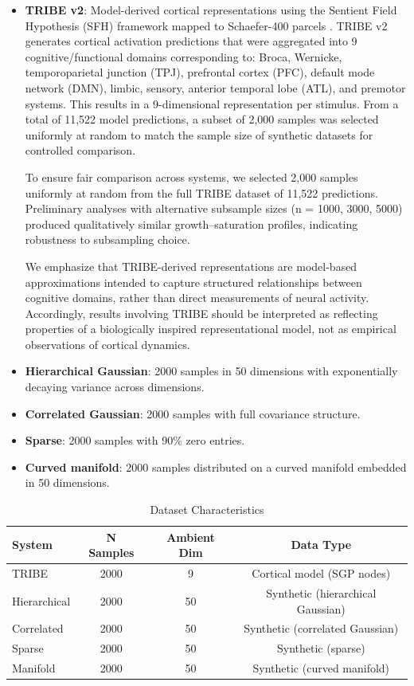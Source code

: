 \begin{itemize}
	\item \textbf{TRIBE v2}: Model-derived cortical representations using the Sentient Field Hypothesis (SFH) framework mapped to Schaefer-400 parcels \citep{Schaefer2018}. TRIBE v2 generates cortical activation predictions that were aggregated into 9 cognitive/functional domains corresponding to: Broca, Wernicke, temporoparietal junction (TPJ), prefrontal cortex (PFC), default mode network (DMN), limbic, sensory, anterior temporal lobe (ATL), and premotor systems. This results in a 9-dimensional representation per stimulus. From a total of 11,522 model predictions, a subset of 2,000 samples was selected uniformly at random to match the sample size of synthetic datasets for controlled comparison.

	      To ensure fair comparison across systems, we selected 2,000 samples uniformly at random from the full TRIBE dataset of 11,522 predictions. Preliminary analyses with alternative subsample sizes (n = 1000, 3000, 5000) produced qualitatively similar growth--saturation profiles, indicating robustness to subsampling choice.

	      We emphasize that TRIBE-derived representations are model-based approximations intended to capture structured relationships between cognitive domains, rather than direct measurements of neural activity. Accordingly, results involving TRIBE should be interpreted as reflecting properties of a biologically inspired representational model, not as empirical observations of cortical dynamics.

	\item \textbf{Hierarchical Gaussian}: 2000 samples in 50 dimensions with exponentially decaying variance across dimensions.
	\item \textbf{Correlated Gaussian}: 2000 samples with full covariance structure.
	\item \textbf{Sparse}: 2000 samples with 90\% zero entries.
	\item \textbf{Curved manifold}: 2000 samples distributed on a curved manifold embedded in 50 dimensions.
\end{itemize}

\begin{table}[htbp]
	\centering
	\caption{Dataset Characteristics}
	\label{tab:datasets}
	\begin{tabular}{@{}lccc@{}}
		\toprule
		System       & N Samples & Ambient Dim & Data Type                         \\
		\midrule
		TRIBE        & 2000      & 9           & Cortical model (SGP nodes)        \\
		Hierarchical & 2000      & 50          & Synthetic (hierarchical Gaussian) \\
		Correlated   & 2000      & 50          & Synthetic (correlated Gaussian)   \\
		Sparse       & 2000      & 50          & Synthetic (sparse)                \\
		Manifold     & 2000      & 50          & Synthetic (curved manifold)       \\
		\bottomrule
	\end{tabular}
\end{table}

